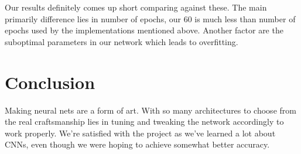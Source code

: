 \documentclass{kthreport}
\begin{document}
Our results definitely comes up short comparing against these. The main primarily difference lies in number of epochs, our 60 is much less than number of epochs used by the implementations mentioned above. Another factor are the suboptimal parameters in our network which leads to overfitting.

\section{Conclusion}
Making neural nets are a form of art. With so many architectures to choose from the real craftsmanship lies in tuning and tweaking the network accordingly to work properly. We're satisfied with the project as we've learned a lot about CNNs, even though we were hoping to achieve somewhat better accuracy.


{}

\end{document}
